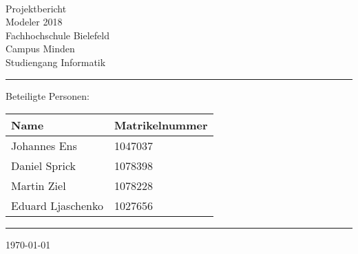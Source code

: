 


\begin{titlepage}
   \mbox{}\vspace{5\baselineskip}\\
   \sffamily\huge
   \centering
   {\Huge Projektbericht} \\
   \normalsize Modeler 2018
   \vspace{3\baselineskip}\\
   \rmfamily\Large
  Fachhochschule Bielefeld \\
  Campus Minden \\
  Studiengang Informatik
   \vspace{1\baselineskip}\\
\noindent\rule{15cm}{0.3pt}
Beteiligte Personen:
\begin{table}[H]
	\tablestyle
	\begin{tabular}{*{2}{v{0.45\textwidth}}}
		\hline
		\textbf{Name} &
		\textbf{Matrikelnummer} \tabularnewline
		\hline
		Johannes Ens & 1047037\tabularnewline
		Daniel Sprick & 1078398\tabularnewline
		Martin Ziel & 1078228\tabularnewline
		Eduard Ljaschenko& 1027656\tabularnewline

	\end{tabular}
\end{table}
   \noindent\rule{15cm}{0.4pt}

   \today
\end{titlepage}

